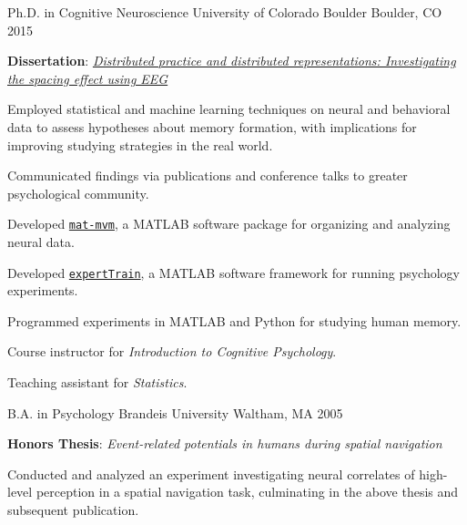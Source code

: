 

\begin{cventries}

  \cventry
    {Ph.D. in Cognitive Neuroscience} %
    {University of Colorado Boulder} %
    {Boulder, CO} %
    {2015} %
    {
      \begin{cvitems} %
        \item {\textbf{Dissertation}: {\href{https://scholar.colorado.edu/psyc_gradetds/93/}{\textit{Distributed practice and distributed representations: Investigating the spacing effect using EEG}}}}
        \item {Employed statistical and machine learning techniques on neural and behavioral data to assess hypotheses about memory formation, with implications for improving studying strategies in the real world.}
        \item {Communicated findings via publications and conference talks to greater psychological community.}
        \item {Developed {\href{https://github.com/warmlogic/mat-mvm}{\texttt{mat-mvm}}}, a MATLAB software package for organizing and analyzing neural data.}
        \item {Developed {\href{https://github.com/warmlogic/expertTrain}{\texttt{expertTrain}}}, a MATLAB software framework for running psychology experiments.}
        \item {Programmed experiments in MATLAB and Python for studying human memory.}
        \item {Course instructor for \textit{Introduction to Cognitive Psychology}.}
        \item {Teaching assistant for \textit{Statistics}.}
      \end{cvitems}
    }

  \cventry
    {B.A. in Psychology} %
    {Brandeis University} %
    {Waltham, MA} %
    {2005} %
    {
      \begin{cvitems} %
        \item {\textbf{Honors Thesis}: \textit{Event-related potentials in humans during spatial navigation}}
        \item {Conducted and analyzed an experiment investigating neural correlates of high-level perception in a spatial navigation task, culminating in the above thesis and subsequent publication.}
      \end{cvitems}
    }

\end{cventries}
